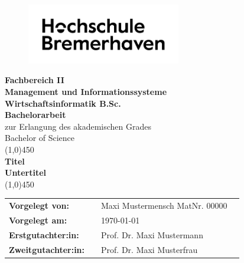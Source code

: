 
\thispagestyle{empty}
\begin{figure}[h!]
 \centering
 \includegraphics[width=0.6\textwidth]{src/abbildungen/logo.png}
\end{figure}
\begin{center}
\large\textbf{Fachbereich II \\ Management und Informationssysteme}\\
\large\textbf{Wirtschaftsinformatik B.Sc.}\\
\vspace{1cm}
\LARGE\textbf{Bachelorarbeit}\\
\large{zur Erlangung des akademischen Grades \\ Bachelor of Science}\\
\vspace*{\fill}
\line(1,0){450}\\
\doublespacing
\textbf{\Large{Titel}}\\
\textbf{\large{Untertitel}}\\
\line(1,0){450}\\
\end{center}
\vspace*{\fill}
\onehalfspacing
\begin{flushleft}
\begin{tabular}{llll}
  \textbf{Vorgelegt von:} & & Maxi Mustermensch MatNr. 00000 \\
\textbf{Vorgelegt am:} & & \today &\\
\textbf{Erstgutachter:in:} & & Prof. Dr. Maxi Mustermann & \\
\textbf{Zweitgutachter:in:} & & Prof. Dr. Maxi Musterfrau &\\
\end{tabular}
\end{flushleft}
